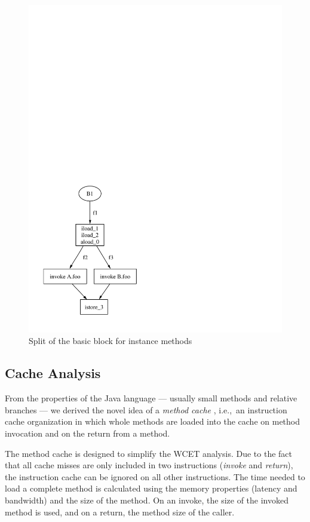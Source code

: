 \begin{figure}
    \centering
    \includegraphics[scale=0.5]{wcet/dispatch_split}
    \caption{Split of the basic block for instance methods}
    \label{fig:dispatch:split}
\end{figure}



\subsection{Cache Analysis} \label{sec:wcet:cache}

From the properties of the Java language
--- usually small methods and relative branches --- we derived the
novel idea of a \emph{method cache} \cite{jop:jtres_cache}, i.e.,\ an
instruction cache organization in which whole methods are loaded into
the cache on method invocation and on the return from a method.

The method cache is designed to simplify the WCET analysis. Due to
the fact that all cache misses are only included in two instructions
(\emph{invoke} and \emph{return}), the instruction cache can be
ignored on all other instructions. The time needed to load a complete
method is calculated using the memory properties (latency and
bandwidth) and the size of the method. On an invoke, the size of the
invoked method is used, and on a return, the method size of the
caller.

